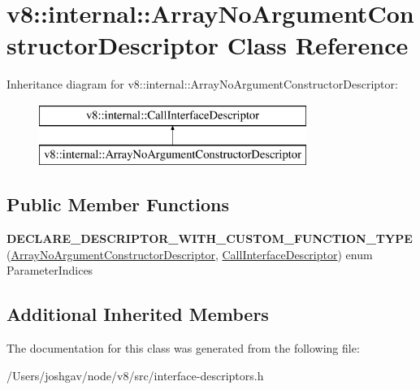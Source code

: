 \hypertarget{classv8_1_1internal_1_1_array_no_argument_constructor_descriptor}{}\section{v8\+:\+:internal\+:\+:Array\+No\+Argument\+Constructor\+Descriptor Class Reference}
\label{classv8_1_1internal_1_1_array_no_argument_constructor_descriptor}
Inheritance diagram for v8\+:\+:internal\+:\+:Array\+No\+Argument\+Constructor\+Descriptor\+:\begin{figure}[H]
\begin{center}
\leavevmode
\includegraphics[height=2.000000cm]{classv8_1_1internal_1_1_array_no_argument_constructor_descriptor}
\end{center}
\end{figure}
\subsection*{Public Member Functions}
\begin{DoxyCompactItemize}
\item 
{\bfseries D\+E\+C\+L\+A\+R\+E\+\_\+\+D\+E\+S\+C\+R\+I\+P\+T\+O\+R\+\_\+\+W\+I\+T\+H\+\_\+\+C\+U\+S\+T\+O\+M\+\_\+\+F\+U\+N\+C\+T\+I\+O\+N\+\_\+\+T\+Y\+PE} (\hyperlink{classv8_1_1internal_1_1_array_no_argument_constructor_descriptor}{Array\+No\+Argument\+Constructor\+Descriptor}, \hyperlink{classv8_1_1internal_1_1_call_interface_descriptor}{Call\+Interface\+Descriptor}) enum Parameter\+Indices\hypertarget{classv8_1_1internal_1_1_array_no_argument_constructor_descriptor_a61c5822d186e806cb8ed603e183d6a2c}{}\label{classv8_1_1internal_1_1_array_no_argument_constructor_descriptor_a61c5822d186e806cb8ed603e183d6a2c}

\end{DoxyCompactItemize}
\subsection*{Additional Inherited Members}


The documentation for this class was generated from the following file\+:\begin{DoxyCompactItemize}
\item 
/\+Users/joshgav/node/v8/src/interface-\/descriptors.\+h\end{DoxyCompactItemize}
